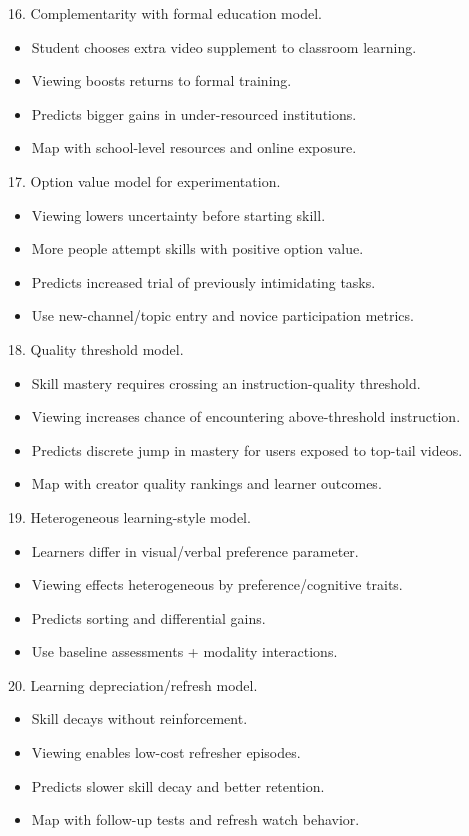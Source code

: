 \documentclass[11pt]{article}
\begin{document}
16. Complementarity with formal education model.\\
\begin{itemize}
\item Student chooses extra video supplement to classroom learning.
\item Viewing boosts returns to formal training.
\item Predicts bigger gains in under-resourced institutions.
\item Map with school-level resources and online exposure.
\end{itemize}

17. Option value model for experimentation.\\
\begin{itemize}
\item Viewing lowers uncertainty before starting skill.
\item More people attempt skills with positive option value.
\item Predicts increased trial of previously intimidating tasks.
\item Use new-channel/topic entry and novice participation metrics.
\end{itemize}

18. Quality threshold model.\\
\begin{itemize}
\item Skill mastery requires crossing an instruction-quality threshold.
\item Viewing increases chance of encountering above-threshold instruction.
\item Predicts discrete jump in mastery for users exposed to top-tail videos.
\item Map with creator quality rankings and learner outcomes.
\end{itemize}

19. Heterogeneous learning-style model.\\
\begin{itemize}
\item Learners differ in visual/verbal preference parameter.
\item Viewing effects heterogeneous by preference/cognitive traits.
\item Predicts sorting and differential gains.
\item Use baseline assessments + modality interactions.
\end{itemize}

20. Learning depreciation/refresh model.\\
\begin{itemize}
\item Skill decays without reinforcement.
\item Viewing enables low-cost refresher episodes.
\item Predicts slower skill decay and better retention.
\item Map with follow-up tests and refresh watch behavior.
\end{itemize}
\end{document}
